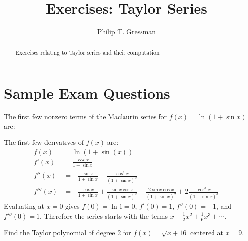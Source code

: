 \documentclass{ximera}
\title{Exercises: Taylor Series}
\author{Philip T. Gressman}
\begin{document}
\begin{abstract}
Exercises relating to Taylor series and their computation.
\end{abstract}
\maketitle

\section*{Sample Exam Questions}

\begin{question}%

The first few nonzero terms of the Maclaurin series for \(f(x) = \ln ( 1 + \sin x)\) are:
\begin{multiplechoice}
\end{multiplechoice}
\begin{feedback}
The first few derivatives of \(f(x)\) are:
\[\begin{aligned}
f(x) & = \ln (1 + \sin(x)) \\
f'(x) & = \frac{ \cos x}{1 + \sin x} \\
f''(x) & = - \frac{\sin x}{1 + \sin x} - \frac{\cos^2 x}{(1 + \sin x)^2} \\
f'''(x) & = - \frac{\cos x}{1 + \sin x} + \frac{\sin x \cos x}{(1 + \sin x)^2} - \frac{2 \sin x \cos x}{(1 + \sin x)^2} + 2 \frac{\cos^3 x}{(1 + \sin x)^3}
\end{aligned}\]
Evaluating at \(x = 0\) gives \(f(0) = \ln 1 = 0\), \(f'(0) = 1\), \(f''(0) = -1\), and \(f'''(0) = 1\). Therefore the series starts with the terms \(x - \frac{1}{2} x^2 + \frac{1}{6} x^3 + \cdots\).
\end{feedback}

\end{question}

\begin{question}%

Find the Taylor polynomial of degree 2 for \(f(x) = \sqrt{x+16}\) centered at \(x=9\).
\begin{multiplechoice}
\end{multiplechoice}

\end{question}
\end{document}
